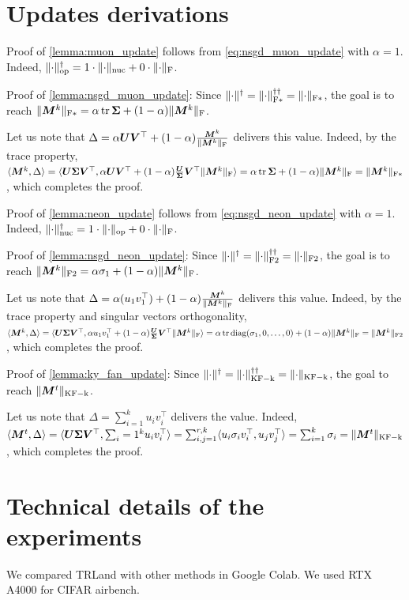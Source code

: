 \documentclass{article} %
\newcommand{\norm}[1]{\lVert #1\rVert}
\DeclarePairedDelimiter{\normf}{\|}{\|_\mathrm{F}}
\DeclarePairedDelimiter{\normkfk}{\|}{\|_\mathrm{KF-k}}
\DeclarePairedDelimiter{\normfstar}{\|}{\|_\mathrm{F*}}
\DeclarePairedDelimiter{\normftwo}{\|}{\|_\mathrm{F2}}
\DeclarePairedDelimiter{\norms}{\|}{\|_{\mathrm{op}}}
\DeclarePairedDelimiter{\normn}{\|}{\|_{\mathrm{nuc}}}
\def\<#1,#2>{\langle #1,#2\rangle}
\DeclareMathOperator{\tr}{tr}
\DeclareMathOperator{\diag}{diag}
\begin{document}
\section{Updates derivations}

Proof of \cref{lemma:muon_update} follows from \cref{eq:nsgd_muon_update} with $\alpha=1$. Indeed, $\norms{\cdot}^\dagger=1\cdot\normn{\cdot} + 0 \cdot \normf{\cdot} $.

Proof of \cref{lemma:nsgd_muon_update}:
Since $\norm{\cdot}^\dagger = \normfstar{\cdot}^{\dagger\dagger} = \normfstar{\cdot}$, the goal is to reach $\normfstar{\mM^k} = \alpha \tr{\mSigma} + (1-\alpha) \normf{\mM^k}$.

Let us note that $\Delta = \alpha \mU \mV^\top + (1-\alpha) \frac{\mM^k}{\normf{\mM^k}}$ delivers this value. Indeed, by the trace property, $\<\mM^k, \Delta> =\<\mU \mSigma \mV^\top, \alpha \mU \mV^\top + (1-\alpha) \frac{\mU \mSigma \mV^\top}{\normf{\mM^k}}> = \alpha \tr \mSigma + (1-\alpha) \normf{\mM^k} = \normfstar{\mM^k}$, which completes the proof.

Proof of \cref{lemma:neon_update} follows from \cref{eq:nsgd_neon_update} with $\alpha=1$. Indeed, $\normn{\cdot}^\dagger=1\cdot\norms{\cdot} + 0 \cdot \normf{\cdot} $.

Proof of \cref{lemma:nsgd_neon_update}:
Since $\norm{\cdot}^\dagger = \normftwo{\cdot}^{\dagger\dagger} = \normftwo{\cdot}$, the goal is to reach $\normftwo{\mM^k} = \alpha \sigma_1 + (1-\alpha) \normf{\mM^k}$.

Let us note that $\Delta = \alpha (u_1 v_1^\top) + (1-\alpha) \frac{\mM^k}{\normf{\mM^k}}$ delivers this value. Indeed, by the trace property and singular vectors orthogonality, $\<\mM^k, \Delta> =\<\mU \mSigma \mV^\top, \alpha u_1 v_1^\top + (1-\alpha) \frac{\mU \mSigma \mV^\top}{\normf{\mM^k}}> = \alpha \tr \diag({\sigma_1, 0, \dots, 0}) + (1-\alpha) \normf{\mM^k} = \normftwo{\mM^k}$, which completes the proof.


Proof of \cref{lemma:ky_fan_update}:
Since $\norm{\cdot}^\dagger = \normkfk{\cdot}^{\dagger\dagger} = \normkfk{\cdot}$, the goal to reach $\normkfk{\mM^t}$.

Let us note that $\Delta = \sum_{i=1}^{k} u_i v_i^\top$ delivers the value. Indeed, $\<\mM^t, \Delta> =\<\mU \mSigma \mV^\top, \sum_{i=1}^{k} u_i v_i^\top> = \sum_{i,j=1}^{r, k}\<u_i \sigma_i v_i^\top, u_j v_j^\top> = \sum_{i=1}^{k}\sigma_i = \normkfk{\mM^t}$, which completes the proof. 

\section{Technical details of the experiments}
We compared TRLand with other methods in Google Colab. We used RTX A4000 for CIFAR airbench.
\end{document}
